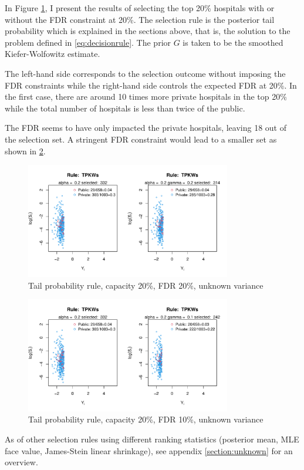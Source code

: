 \documentclass[12pt]{article}
\begin{document}
In Figure \ref{fig:tp_0.2_0.2_2d}, I present the results of selecting the top
20\% hospitals with or without the FDR constraint at 20\%. The selection rule
is the posterior tail probability which is explained in the sections above,
that is, the solution to the problem defined in \ref{eq:decisionrule}. The
prior $G$ is taken to be the smoothed Kiefer-Wolfowitz estimate.

The left-hand side corresponds to the selection outcome without imposing the
FDR constraints while the right-hand side controls the expected FDR at 20\%. In
the first case, there are around 10 times more private hospitals in the top
20\% while the total number of hospitals is less than twice of the public.

The FDR seems to have only impacted the private hospitals, leaving 18 out of
the selection set. A stringent FDR constraint would lead to a smaller set as
shown in \ref{fig:tp_0.2_0.1_2d}.

\begin{figure}[h!]
    \centering
    \includegraphics[width=0.8\textwidth]{../../Figures/2013-2022/GMM_m/GLVmix/Left_0.2_0.2_TPKWs.pdf}
    \caption{Tail probability rule, capacity 20\%, FDR 20\%, unknown variance}
    \label{fig:tp_0.2_0.2_2d}
\end{figure}

\begin{figure}[h!]
    \centering
    \includegraphics[width=0.8\textwidth]{../../Figures/2013-2022/GMM_m/GLVmix/Left_0.2_0.1_TPKWs.pdf}
    \caption{Tail probability rule, capacity 20\%, FDR 10\%, unknown variance}
    \label{fig:tp_0.2_0.1_2d}
\end{figure}
As of other selection rules using different ranking statistics (posterior mean, MLE face value, James-Stein linear shrinkage), see appendix \ref{section:unknown} for an overview.
\end{document}
